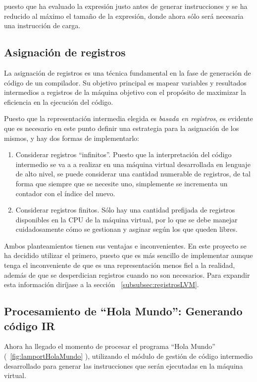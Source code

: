 puesto que ha evaluado la expresión justo antes de generar instrucciones y se ha reducido al máximo el tamaño de la expresión, donde ahora sólo será necesaria una instrucción de carga.

\subsection{Asignación de registros}\label{subsec:asignacionRegIR}
La asignación de registros es una técnica fundamental en la fase de generación de código de un compilador. Su objetivo principal es mapear variables y resultados intermedios a registros de la máquina objetivo con el propósito de maximizar la eficiencia en la ejecución del código.

\vspace{0.5cm}
Puesto que la representación intermedia elegida es \textit{basada en registros}, es evidente que es necesario en este punto definir una estrategia para la asignación de los mismos, y hay dos formas de implementarlo:

\begin{enumerate}
    \item Considerar registros ``infinitos''. Puesto que la interpretación del código intermedio se va a a realizar en una máquina virtual desarrollada en lenguaje de alto nivel, se puede considerar una cantidad numerable de registros, de tal forma que siempre que se necesite uno, simplemente se incrementa un contador con el índice del nuevo.
    \item Considerar registros finitos. Sólo hay una cantidad prefijada de registros disponibles en la CPU de la máquina virtual, por lo que se debe manejar cuidadosamente cómo se gestionan y asginar según los que queden libres.
\end{enumerate}

Ambos planteamientos tienen sus ventajas e inconvenientes. En este proyecto se ha decidido utilizar el primero, puesto que es más sencillo de implementar aunque tenga el inconveniente de que es una representación menos fiel a la realidad, además de que se desperdician registros cuando no son necesarios. Para expandir esta información diríjase a la sección ~\ref{subsubsec:registrosLVM}.

\subsection{Procesamiento de ``Hola Mundo'': Generando código IR}
Ahora ha llegado el momento de procesar el programa ``Hola Mundo'' (~\ref{fig:lamportHolaMundo} ), utilizando el módulo de gestión de código intermedio desarrollado para generar las instrucciones que serán ejecutadas en la máquina virtual.

